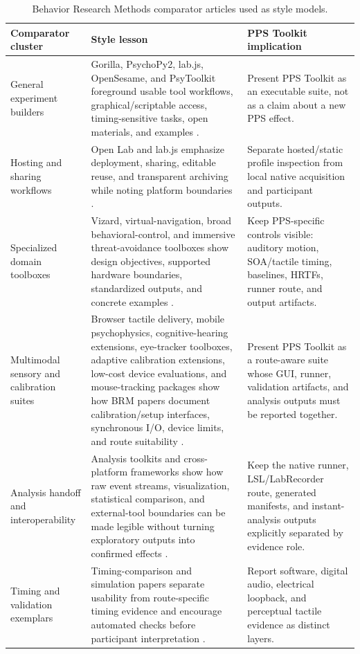 \documentclass[pdflatex,sn-apa]{sn-jnl}
\begin{document}
\begin{table}[t]
\caption{Behavior Research Methods comparator articles used as style models.}
\label{tab:brm-comparators}
\footnotesize
\begin{tabularx}{\textwidth}{>{\raggedright\arraybackslash}p{} >{\raggedright\arraybackslash}X >{\raggedright\arraybackslash}p{}}
\toprule
Comparator cluster & Style lesson & PPS Toolkit implication \\
\midrule
General experiment builders & Gorilla, PsychoPy2, lab.js, OpenSesame, and PsyToolkit foreground usable tool workflows, graphical/scriptable access, timing-sensitive tasks, open materials, and examples \citep{AnwylIrvine2018,Peirce2019,Henninger2021,Mathot2011,Stoet2010}. & Present PPS Toolkit as an executable suite, not as a claim about a new PPS effect. \\
Hosting and sharing workflows & Open Lab and lab.js emphasize deployment, sharing, editable reuse, and transparent archiving while noting platform boundaries \citep{Shevchenko2022,Henninger2021}. & Separate hosted/static profile inspection from local native acquisition and participant outputs. \\
Specialized domain toolboxes & Vizard, virtual-navigation, broad behavioral-control, and immersive threat-avoidance toolboxes show design objectives, supported hardware boundaries, standardized outputs, and concrete examples \citep{Schuetz2022,AlsburyNealy2021,Otto2023,Brookes2023}. & Keep PPS-specific controls visible: auditory motion, SOA/tactile timing, baselines, HRTFs, runner route, and output artifacts. \\
Multimodal sensory and calibration suites & Browser tactile delivery, mobile psychophysics, cognitive-hearing extensions, eye-tracker toolboxes, adaptive calibration extensions, low-cost device evaluations, and mouse-tracking packages show how BRM papers document calibration/setup interfaces, synchronous I/O, device limits, and route suitability \citep{Hirst2026,Inuggi2024,Sulas2022,Niehorster2020,Niehorster2024Adaptive,Gibaldi2016,Kieslich2017}. & Present PPS Toolkit as a route-aware suite whose GUI, runner, validation artifacts, and analysis outputs must be reported together. \\
Analysis handoff and interoperability & Analysis toolkits and cross-platform frameworks show how raw event streams, visualization, statistical comparison, and external-tool boundaries can be made legible without turning exploratory outputs into confirmed effects \citep{Kieslich2017,Ghose2020,Henninger2016}. & Keep the native runner, LSL/LabRecorder route, generated manifests, and instant-analysis outputs explicitly separated by evidence role. \\
Timing and validation exemplars & Timing-comparison and simulation papers separate usability from route-specific timing evidence and encourage automated checks before participant interpretation \citep{Bridges2020,DeLeeuw2015,DeLeeuw2022}. & Report software, digital audio, electrical loopback, and perceptual tactile evidence as distinct layers. \\
\bottomrule
\end{tabularx}
\end{table}
\end{document}
